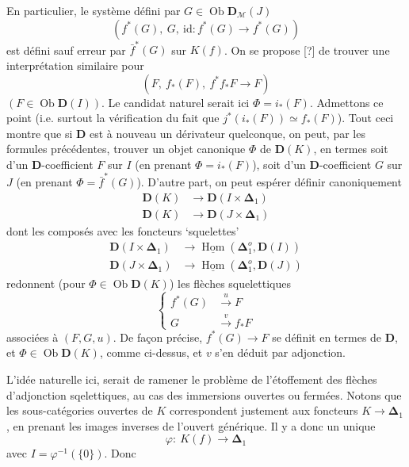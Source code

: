 \documentclass[11pt]{article}
\newcommand{\msp}[1]{\marginpar{\footnotesize [#1]}}
\newcommand{\uHom}{\underline{\operatorname{Hom}}}
\newcommand{\Ob}{\operatorname{Ob}}
\newcommand{\id}{\mathrm{id}}
\newcommand{\bDelta}{\boldsymbol{\Delta}}
\begin{document}
En particulier, le système défini par $G \in \Ob \mathbf{D}_{\mathcal{M}}(J)$
\[ (f^*(G),\ G,\ \id : f^*(G) \longrightarrow f^*(G)) \]
est défini sauf erreur par $\bar{f}^*(G)$ sur $K(f)$. On se propose [?] de trouver une interprétation similaire pour
\[ (F,\ f_*(F),\ f^*f_*F \longrightarrow F) \]
$(F \in \Ob \mathbf{D}(I))$. Le candidat naturel serait ici $\Phi = i_*(F)$. Admettons ce point (i.e. surtout la vérification du fait que $j^*(i_*(F)) \simeq f_*(F)$). Tout ceci montre que si $\mathbf{D}$ est à nouveau un dérivateur quelconque, on peut, par les formules précédentes, trouver un objet canonique $\Phi$ de $\mathbf{D}(K)$, en termes soit d'un $\mathbf{D}$-coefficient $F$ sur $I$ (en prenant $\Phi = i_*(F)$), soit d'un $\mathbf{D}$-coefficient $G$ sur $J$ (en prenant $\Phi = \bar{f}^*(G)$). D'autre part, on peut espérer définir canoniquement
\[
\begin{aligned}
\mathbf{D}(K) &\longrightarrow \mathbf{D}(I \times \bDelta_1)\\
\mathbf{D}(K) &\longrightarrow \mathbf{D}(J \times \bDelta_1)
\end{aligned}
\]
dont les composés avec les foncteurs ‘squelettes’
\[
\begin{aligned}
\mathbf{D}(I \times \bDelta_1) &\longrightarrow \uHom(\bDelta_1^o, \mathbf{D}(I))\\
\mathbf{D}(J \times \bDelta_1) &\longrightarrow \uHom(\bDelta_1^o, \mathbf{D}(J))
\end{aligned}
\]
\msp{page 83}
redonnent (pour $\Phi \in \Ob \mathbf{D}(K)$) les flèches squelettiques
\[
\left\{
\begin{aligned}
f^*(G) &\xrightarrow{\ u\ } F\\
G &\xrightarrow{\ v\ } f_*F
\end{aligned}
\right.
\]
associées à $(F,G,u)$. De façon précise, $f^*(G) \longrightarrow F$ se définit en termes de $\mathbf{D}$, et $\Phi \in \Ob \mathbf{D}(K)$, comme ci-dessus, et $v$ s'en déduit par adjonction.

L'idée naturelle ici, serait de ramener le problème de l'étoffement des flèches d'adjonction sqelettiques, au cas des immersions ouvertes ou fermées. Notons que les sous-catégories ouvertes de $K$ correspondent justement aux foncteurs $K \longrightarrow \bDelta_1$, en prenant les images inverses de l'ouvert générique. Il y a donc un unique %
\[ \varphi :\ K(f) \longrightarrow \bDelta_1 \]
avec $I = \varphi^{-1}(\{0\})$. Donc
\end{document}
